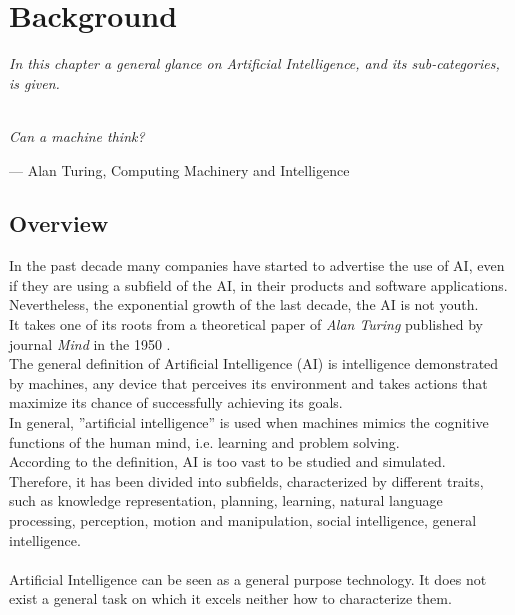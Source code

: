 \chapter{Background}
\textit{In this chapter a general glance on Artificial Intelligence, and its sub-categories, is given.}\\\\

\epigraph{ \textit{Can a machine think?}}{--- \textup{Alan Turing}, Computing Machinery and Intelligence}

\section{Overview}
In the past decade many companies have started to advertise the use of AI, even if they are using a subfield of the AI, in their products and software applications. Nevertheless, the exponential growth of the last decade,
the AI is not youth.\\ It takes one of its roots from a theoretical paper of \textit{Alan Turing} published by journal \textit{Mind} in the 1950 \cite{paper:36}.\\

The general definition of Artificial Intelligence (AI) is intelligence demonstrated by machines, any device that perceives its environment and takes actions that maximize its chance of successfully achieving its goals.\\ In general, ''artificial intelligence'' is used when machines mimics the cognitive functions of the human mind, i.e. learning and problem solving.\\
According to the definition, AI is too vast to be studied and simulated. Therefore, it has been divided into subfields, characterized by different traits, such as knowledge representation, planning, learning, natural language processing, perception, motion and manipulation, social intelligence, general intelligence.\\\\

Artificial Intelligence can be seen as a general purpose technology. It does not exist a general task on which it excels neither how to characterize them.

